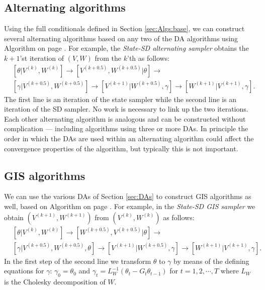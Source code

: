 \documentclass[12pt]{article}
\begin{document}
\subsection{Alternating algorithms}\label{sec:Algs:alt}
Using the full conditionals defined in Section \ref{sec:Algs:base}, we can construct several alternating algorithms based on any two of the DA algorithms using Algorithm  on page \pageref{alg:Alt}. For example, the {\it State-SD alternating sampler} obtains the $k+1$'st iteration of $(V,W)$ from the $k$'th as follows:
\begin{align*}
&[\theta|V^{(k)},W^{(k)}] \to [V^{(k+0.5)},W^{(k+0.5)}|\theta] \to\\
&[\gamma|V^{(k+0.5)},W^{(k+0.5)}] \to [V^{(k+1)}|W^{(k+0.5)},\gamma] \to [W^{(k+1)}|V^{(k+1)},\gamma].
\end{align*}
The first line is an iteration of the state sampler while the second line is an iteration of the SD sampler. No work is necessary to link up the two iterations. Each other alternating algorithm is analogous and can be constructed without complication --- including algorithms using three or more DAs. In principle the order in which the DAs are used within an alternating algorithm could affect the convergence properties of the algorithm, but typically this is not important. 

\subsection{GIS algorithms}\label{sec:Algs:GIS}
We can use the various DAs of Section \ref{sec:DAs} to construct GIS algorithms as well, based on Algorithm  on page \pageref{alg:eGIS}. For example, in the {\it State-SD GIS sampler} we obtain $(V^{(k+1)},W^{(k+1)})$ from $(V^{(k)},W^{(k)})$ as follows:
\begin{align*}
&[\theta|V^{(k)},W^{(k)}] \to [W^{(k+0.5)},V^{(k+0.5)}|\theta] \to\\
&[\gamma|V^{(k+0.5)},W^{(k+0.5)},\theta] \to [V^{(k+1)}|W^{(k+0.5)},\gamma] \to [W^{(k+1)}|V^{(k+1)},\gamma].
\end{align*}
In the first step of the second line we transform $\theta$ to $\gamma$ by means of the defining equations for $\gamma$: $\gamma_0=\theta_0$ and $\gamma_t = L_W^{-1}(\theta_t - G_t\theta_{t-1})$ for $t=1,2,\cdots,T$ where $L_W$ is the Cholesky decomposition of $W$. 
\end{document}

